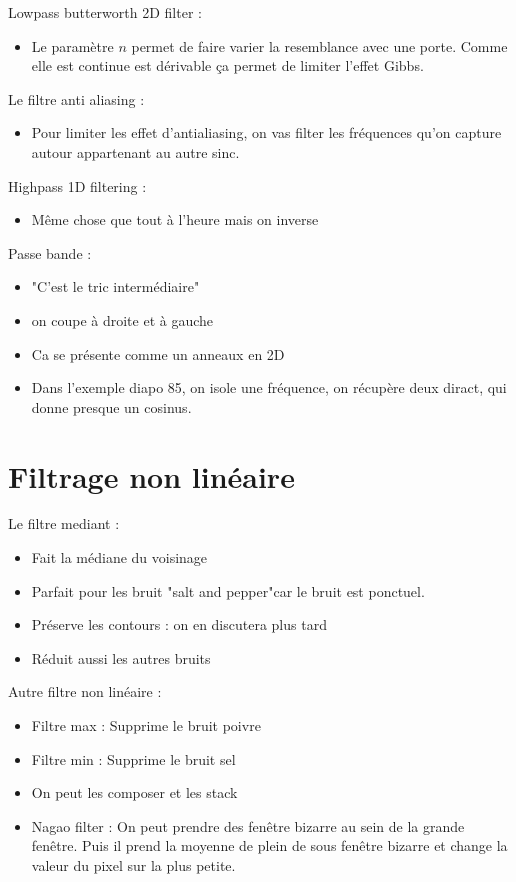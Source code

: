 \documentclass{article}
\theoremstyle{plain}%
\theoremstyle{definition}
\theoremstyle{remark}
\begin{document}
Lowpass butterworth 2D filter :
\begin{itemize}
    \item Le paramètre $ n $ permet de faire varier la resemblance avec une porte. Comme elle est continue est dérivable ça permet de limiter l'effet Gibbs. 
\end{itemize}

Le filtre anti aliasing : 
\begin{itemize}
    \item Pour limiter les effet d'antialiasing, on vas filter les fréquences qu'on capture autour appartenant au autre sinc.
\end{itemize}

Highpass 1D filtering : 
\begin{itemize}
    \item Même chose que tout à l'heure mais on inverse 
\end{itemize}

Passe bande :
\begin{itemize}
    \item "C'est le tric intermédiaire"
    \item on coupe à droite et à gauche
    \item Ca se présente comme un anneaux en 2D
    \item Dans l'exemple diapo 85, on isole une fréquence, on récupère deux diract, qui donne presque un cosinus.
\end{itemize}

\section{Filtrage non linéaire}
Le filtre mediant :
\begin{itemize}
    \item Fait la médiane du voisinage
    \item Parfait pour les bruit "salt and pepper"car le bruit est ponctuel.
    \item Préserve les contours : on en discutera plus tard
    \item Réduit aussi les autres bruits
\end{itemize}

Autre filtre non linéaire :
\begin{itemize}
    \item Filtre max : Supprime le bruit poivre
    \item Filtre min : Supprime le bruit sel
    \item On peut les composer et les stack
    \item Nagao filter : On peut prendre des fenêtre bizarre au sein de la grande fenêtre. Puis il prend la moyenne de plein de sous fenêtre bizarre et change la valeur du pixel sur la plus petite. 
\end{itemize}
\end{document}
